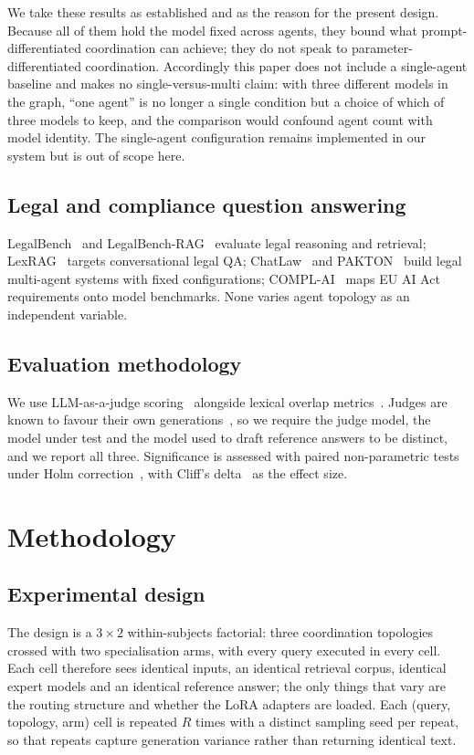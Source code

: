 \documentclass[journal,10pt,compsoc,onecolumn]{IEEEtran}
\begin{document}
We take these results as established and as the reason for the present design.
Because all of them hold the model fixed across agents, they bound what
prompt-differentiated coordination can achieve; they do not speak to
parameter-differentiated coordination. Accordingly this paper does not include a
single-agent baseline and makes no single-versus-multi claim: with three
different models in the graph, ``one agent'' is no longer a single condition but
a choice of which of three models to keep, and the comparison would confound
agent count with model identity. The single-agent configuration remains
implemented in our system but is out of scope here.

\subsection{Legal and compliance question answering}
LegalBench~\cite{guha2023legalbench} and
LegalBench-RAG~\cite{pipitone2024legalbenchrag} evaluate legal reasoning and
retrieval; LexRAG~\cite{li2025lexrag} targets conversational legal QA;
ChatLaw~\cite{cui2023chatlaw} and PAKTON~\cite{raptopoulos2025pakton} build legal
multi-agent systems with fixed configurations;
COMPL-AI~\cite{guldimann2024complai} maps EU AI Act requirements onto model
benchmarks. None varies agent topology as an independent variable.

\subsection{Evaluation methodology}
We use LLM-as-a-judge scoring~\cite{zheng2023mtbench} alongside lexical overlap
metrics~\cite{papineni2002bleu, lin2004rouge}. Judges are known to favour their
own generations~\cite{wataoka2024selfpreference}, so we require the judge model,
the model under test and the model used to draft reference answers to be
distinct, and we report all three. Significance is assessed with paired
non-parametric tests~\cite{wilcoxon1945individual} under Holm
correction~\cite{holm1979simple}, with Cliff's delta~\cite{cliff1993dominance} as
the effect size.

\section{Methodology}

\subsection{Experimental design}
The design is a $3 \times 2$ within-subjects factorial: three coordination
topologies crossed with two specialisation arms, with every query executed in
every cell. Each cell therefore sees identical inputs, an identical retrieval
corpus, identical expert models and an identical reference answer; the only
things that vary are the routing structure and whether the LoRA adapters are
loaded. Each (query, topology, arm) cell is repeated $R$ times with a distinct
sampling seed per repeat, so that repeats capture generation variance rather than
returning identical text.
\end{document}
